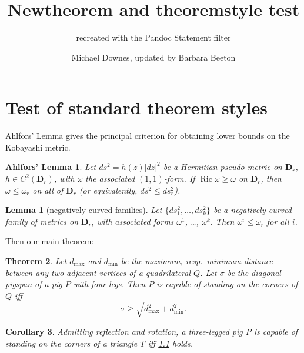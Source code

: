 \documentclass[
]{article}
\title{Newtheorem and theoremstyle test}
\subtitle{recreated with the Pandoc Statement filter}
\author{Michael Downes, updated by Barbara Beeton}
\date{}
\theoremstyle{plain}
\newtheorem*{ahlfors�___lemma}{Ahlfors' Lemma}
\theoremstyle{plain}
\newtheorem{theorem}{Theorem}[section]
\theoremstyle{plain}
\newtheorem{lemma}[theorem]{Lemma}
\theoremstyle{plain}
\newtheorem{corollary}[theorem]{Corollary}
\theoremstyle{plain}
\theoremstyle{exercise}
\theoremstyle{note}
\theoremstyle{break}
\theoremstyle{citing}
\theoremstyle{plain}
\begin{document}
\maketitle

\hypertarget{test-of-standard-theorem-styles}{%
\section{Test of standard theorem
styles}\label{test-of-standard-theorem-styles}}

Ahlfors' Lemma gives the principal criterion for obtaining lower bounds
on the Kobayashi metric.

\begin{ahlfors�___lemma}

\protect\hypertarget{ahlforsuxfffd---lemma}{}{}Let \(ds^2 = h(z)|dz|^2\)
be a Hermitian pseudo-metric on \(\mathbf{D}_r\),
\(h\in C^2(\mathbf{D}_r)\), with \(\omega\) the associated
\((1,1)\)-form. If \(\mathop{\mathrm{Ric}}\nolimits\omega\geq\omega\) on
\(\mathbf{D}_r\), then \(\omega\leq\omega_r\) on all of \(\mathbf{D}_r\)
(or equivalently, \(ds^2\leq ds_r^2\)).

\end{ahlfors�___lemma}

\begin{lemma}[negatively curved families]

Let \(\{ds_1^2,\dots,ds_k^2\}\) be a negatively curved family of metrics
on \(\mathbf{D}_r\), with associated forms \(\omega^1\), \ldots,
\(\omega^k\). Then \(\omega^i \leq\omega_r\) for all \(i\).

\end{lemma}

Then our main theorem:

\begin{theorem}

\protect\hypertarget{sdq}{}{}Let \(d_{\max}\) and \(d_{\min}\) be the
maximum, resp.~minimum distance between any two adjacent vertices of a
quadrilateral \(Q\). Let \(\sigma\) be the diagonal pigspan of a pig
\(P\) with four legs. Then \(P\) is capable of standing on the corners
of \(Q\) iff \[\label{sdq}
\sigma\geq \sqrt{d_{\max}^2+d_{\min}^2}.\]

\end{theorem}

\begin{corollary}

Admitting reflection and rotation, a three-legged pig \(P\) is capable
of standing on the corners of a triangle \(T\) iff
\protect\hyperlink{sdq}{1.1} holds.

\end{corollary}
\end{document}
